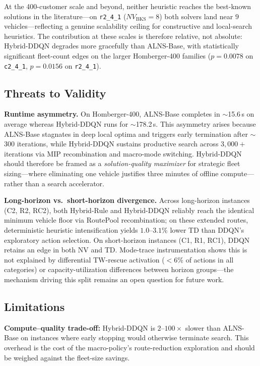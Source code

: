 \documentclass[journal]{IEEEtran}
\newcommand{\BKS}{\text{BKS}}
\begin{document}
At the 400-customer scale and beyond, neither heuristic reaches the best-known
solutions in the literature---on \texttt{r2\_4\_1} ($NV_{\BKS}{=}8$) both solvers
land near $9$ vehicles---reflecting a genuine scalability ceiling for
constructive and local-search heuristics. The contribution at these scales is
therefore relative, not absolute: Hybrid-DDQN degrades more gracefully than
ALNS-Base, with statistically significant fleet-count edges on the larger
Homberger-400 families ($p{=}0.0078$ on \texttt{c2\_4\_1},
$p{=}0.0156$ on \texttt{r2\_4\_1}).

\subsection{Threats to Validity}

\textbf{Runtime asymmetry.}  On Homberger-400, ALNS-Base completes in
$\sim$15.6\,s on average whereas Hybrid-DDQN runs for $\sim$178.2\,s.  This
asymmetry arises because ALNS-Base stagnates in deep local optima and triggers
early termination after $\sim$300 iterations, while Hybrid-DDQN sustains
productive search across $3{,}000{+}$ iterations via MIP recombination and
macro-mode switching.  Hybrid-DDQN should therefore be framed as a
\emph{solution-quality maximizer} for strategic fleet sizing---where eliminating
one vehicle justifies three minutes of offline compute---rather than a search
accelerator.

\textbf{Long-horizon vs.\ short-horizon divergence.}  Across long-horizon
instances (C2, R2, RC2), both Hybrid-Rule and Hybrid-DDQN reliably reach the
identical minimum vehicle floor via RoutePool recombination; on these extended
routes, deterministic heuristic intensification yields $1.0$--$3.1\%$ lower TD
than DDQN's exploratory action selection.  On short-horizon instances (C1, R1,
RC1), DDQN retains an edge in both NV and TD.  Mode-trace instrumentation shows
this is not explained by differential TW-rescue activation ($<6\%$ of actions in
all categories) or capacity-utilization differences between horizon groups---the
mechanism driving this split remains an open question for future work.

\subsection{Limitations}

\textbf{Compute--quality trade-off:}  Hybrid-DDQN is $2$--$100{\times}$ slower
than ALNS-Base on instances where early stopping would otherwise terminate
search.  This overhead is the cost of the macro-policy's route-reduction
exploration and should be weighed against the fleet-size savings.
\end{document}

